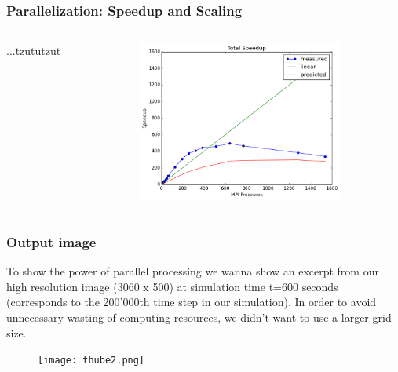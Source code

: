 \documentclass{beamer}
\begin{document}
\begin{frame}
\frametitle{Parallelization: Speedup and Scaling}
\begin{minipage}[1\textheight]{\textwidth}
\begin{columns}[T]
\begin{column}{0.5\textwidth}
\vspace{5mm}
\justify
...tzututzut
\end{column}
\begin{column}{0.5\textwidth}
\begin{figure}
\includegraphics[width=6.75cm]{../analysis/speedup.png}
\caption{}
\end{figure}
\end{column}
\end{columns}
\end{minipage}
\end{frame}
%
%
%
\begin{frame}
\frametitle{Output image}
\justify
To show the power of parallel processing we wanna show an excerpt from our high resolution image (3060 x 500) at simulation time t=600 seconds (corresponds to the 200'000th time step in our simulation). In order to avoid unnecessary wasting of computing resources, we didn't want to use a larger grid size. 
\begin{figure}
\texttt{[image: thube2.png]}
\end{figure}
\end{frame}
%
%
%
\end{document}
